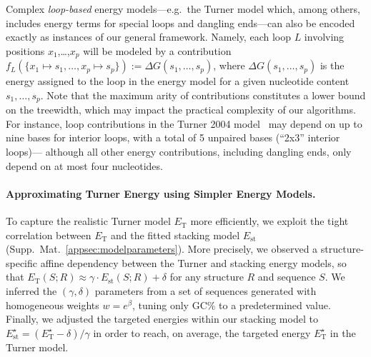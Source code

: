 \documentclass[]{bmcart}
\newcommand{\Def}[1]{\emph{#1}}
\newcommand{\Nuc}[1]{{\sf #1}}
\newcommand{\Cb}{\Nuc{C}}
\newcommand{\Gb}{\Nuc{G}}
\newcommand{\GCb}{\Gb\Cb}
\newcommand{\EnergyTurner}{E_{\text{T}}}
\newcommand{\EnergyStacking}{E_{\text{st}}}
\newcommand{\citep}[1]{\cite{#1}}
\begin{document}
Complex \Def{loop-based} energy models---e.g.~the Turner model which, among others, includes energy terms for special loops and dangling
ends---can also be encoded exactly as instances of our general framework. Namely, each loop $L$ involving positions $x_1$,\ldots,$x_p$ will be modeled by a contribution $f_L(\{x_1\mapsto s_1,\ldots, x_p\mapsto s_p\}):=\Delta G(s_1,\ldots,s_p)$, where $\Delta G(s_1,\ldots,s_p)$ is the energy assigned to the loop in the energy model for a given nucleotide content $s_1,\ldots,s_p$. Note that the maximum arity of contributions constitutes a lower bound on the treewidth, which may impact the practical complexity of our algorithms. For instance, loop contributions in the Turner 2004 model~\citep{Turner2009} may depend on up to
nine bases for interior loops, with a total of 5 unpaired bases (``2x3'' interior loops)--- although all other energy contributions, including dangling ends, only depend on at most four nucleotides.




\paragraph{Approximating Turner Energy using Simpler Energy Models.}
To capture the realistic Turner model $\EnergyTurner$ more efficiently, we exploit the tight correlation between
$\EnergyTurner$ and the fitted stacking model $\EnergyStacking$
(Supp.\ Mat.~\ref{appsec:modelparameters}). More precisely, we observed a
structure-specific affine dependency between the Turner and stacking
energy models, so that
$\EnergyTurner(S;R) \approx \gamma\cdot \EnergyStacking(S;R) + \delta$
for any structure $R$ and sequence $S$. We inferred the
$(\gamma,\delta)$ parameters from a set of sequences generated with
homogeneous weights $w=e^{\beta}$, tuning only \GCb\% to a
predetermined value.  Finally, we adjusted the targeted energies
within our stacking model to
$\EnergyStacking^{\star} = (\EnergyTurner^{\star}- \delta)/\gamma$ in
order to reach, on average, the targeted energy
$\EnergyTurner^{\star}$ in the Turner model.
\end{document}
